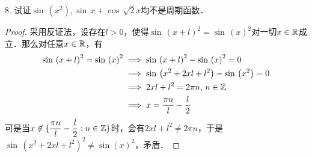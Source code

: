 8. 试证$\sin \, \left(x^2\right), \sin \, x + \cos \, \sqrt{2}x$均不是周期函数．
\begin{proof}
采用反证法，设存在$l > 0$，使得$\sin \, \left(x+l\right)^2=\sin \, \left(x\right)^2$对一切$x \in \mathbb{R}$成立．那么对任意$x \in \mathbb{R}$，有
\begin{align}
    \sin \, \left(x+l\right)^2 = \sin \, \left(x\right)^2 &\implies \sin \, \left(x+l\right)^2-\sin \, \left(x\right)^2 = 0 \\
    &\implies \sin \, \left(x^2 + 2xl + l^2\right) - \sin \, \left(x^2\right) = 0 \\
    &\implies 2xl+l^2 = 2\pi n, \, n \in \mathbb{Z} \\
    &\implies x = \frac{\pi n}{l} - \frac{l}{2}
\end{align}
可是当$x \not\in \{ \displaystyle\frac{\pi n}{l} - \displaystyle\frac{l}{2} : n \in \mathbb{Z} \}$时，会有$2xl+l^2 \neq 2\pi n$，于是$\sin \, \left(x^2+2xl+l^2\right)^2 \neq \sin \left( x \right)^2$，矛盾．
\end{proof}
